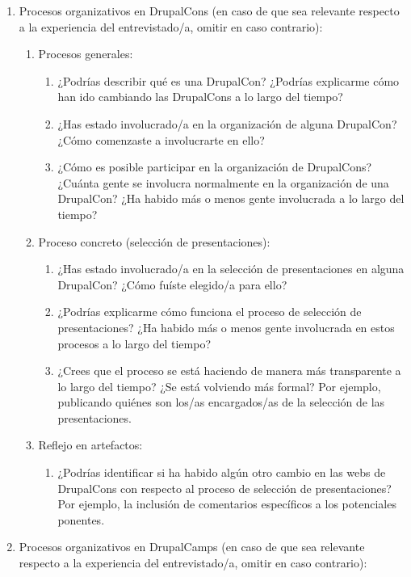 \begin{enumerate}
	\item Procesos organizativos en DrupalCons (en caso de que sea relevante respecto a la experiencia del entrevistado/a, omitir en caso contrario):
		\begin{enumerate}
			\item Procesos generales:
			\begin{enumerate}
				\item ¿Podrías describir qué es una DrupalCon? ¿Podrías explicarme cómo han ido cambiando las DrupalCons a lo largo del tiempo?
				\item ¿Has estado involucrado/a en la organización de alguna DrupalCon? ¿Cómo comenzaste a involucrarte en ello?
				\item ¿Cómo es posible participar en la organización de DrupalCons? ¿Cuánta gente se involucra normalmente en la organización de una DrupalCon? ¿Ha habido más o menos gente involucrada a lo largo del tiempo?
			\end{enumerate}
			
			\item Proceso concreto (selección de presentaciones):
			\begin{enumerate}			
				\item ¿Has estado involucrado/a en la selección de presentaciones en alguna DrupalCon? ¿Cómo fuíste elegido/a para ello?
				\item ¿Podrías explicarme cómo funciona el proceso de selección de presentaciones? ¿Ha habido más o menos gente involucrada en estos procesos a lo largo del tiempo?
				\item ¿Crees que el proceso se está haciendo de manera más transparente a lo largo del tiempo? ¿Se está volviendo más formal? Por ejemplo, publicando quiénes son los/as encargados/as de la selección de las presentaciones.
			\end{enumerate}	

			\item Reflejo en artefactos:
			\begin{enumerate}				
			\item ¿Podrías identificar si ha habido algún otro cambio en las webs de DrupalCons con respecto al proceso de selección de presentaciones? Por ejemplo, la inclusión de comentarios específicos a los potenciales ponentes.
			\end{enumerate}
		\end{enumerate}
		
		
	\item Procesos organizativos en DrupalCamps (en caso de que sea relevante respecto a la experiencia del entrevistado/a, omitir en caso contrario):
		\begin{enumerate}


\end{enumerate}
\end{enumerate}
